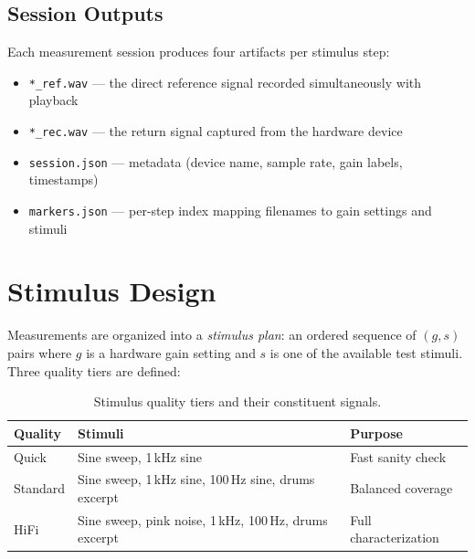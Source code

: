 \documentclass[11pt, letterpaper]{article}
\begin{document}
\subsection{Session Outputs}
Each measurement session produces four artifacts per stimulus step:
\begin{itemize}
    \item \texttt{*\_ref.wav} — the direct reference signal recorded simultaneously with playback
    \item \texttt{*\_rec.wav} — the return signal captured from the hardware device
    \item \texttt{session.json} — metadata (device name, sample rate, gain labels, timestamps)
    \item \texttt{markers.json} — per-step index mapping filenames to gain settings and stimuli
\end{itemize}

\section{Stimulus Design}
\label{sec:stimulus}

Measurements are organized into a \emph{stimulus plan}: an ordered sequence of
$(g, s)$ pairs where $g$ is a hardware gain setting and $s$ is one of the
available test stimuli.  Three quality tiers are defined:

\begin{table}[H]
    \centering
    \begin{tabular}{lll}
        \toprule
        \textbf{Quality} & \textbf{Stimuli} & \textbf{Purpose} \\
        \midrule
        Quick    & Sine sweep, 1\,kHz sine                                      & Fast sanity check \\
        Standard & Sine sweep, 1\,kHz sine, 100\,Hz sine, drums excerpt         & Balanced coverage \\
        HiFi     & Sine sweep, pink noise, 1\,kHz, 100\,Hz, drums excerpt       & Full characterization \\
        \bottomrule
    \end{tabular}
    \caption{Stimulus quality tiers and their constituent signals.}
    \label{tab:quality}
\end{table}

\end{document}
